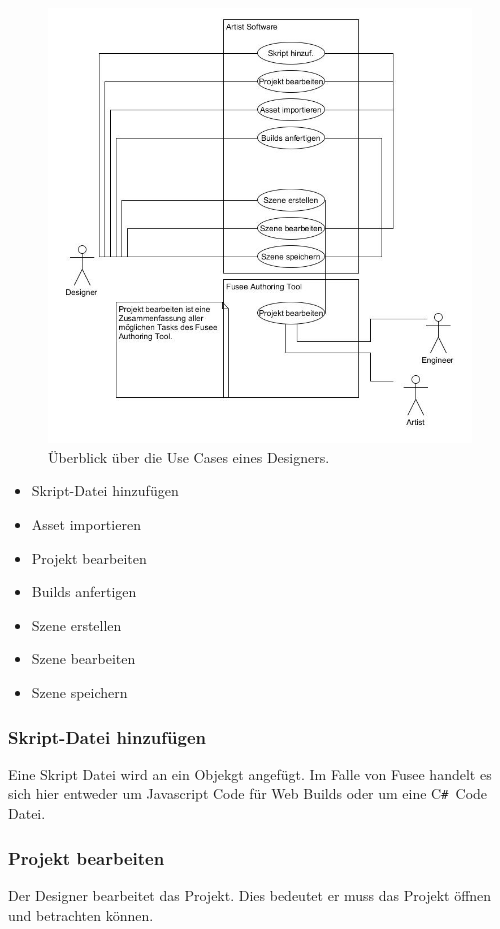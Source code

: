 \documentclass[pagesize, paper=a4, fontsize=12pt, titlepage=true, headings=small, headnosepline, abstractoff, liststotoc, nochapterprefix, plainheadsepline, twoside]{scrreprt}
\newcommand{\CSS}{C\texttt{\# }}
\begin{document}
\begin{figure}[ht]
	\centering
	\includegraphics[width=\linewidth - 2cm]{Bilder/UseCase_Designer.jpg}
	\caption{Überblick über die Use Cases eines Designers.}
	\label{UseCaseDesigner}
\end{figure}

\begin{itemize}
\item Skript-Datei hinzufügen
\item Asset importieren
\item Projekt bearbeiten
\item Builds anfertigen
\item Szene erstellen
\item Szene bearbeiten
\item Szene speichern
\end{itemize}

\subsubsection{Skript-Datei hinzufügen}
Eine Skript Datei wird an ein Objekgt angefügt. Im Falle von Fusee handelt es sich hier entweder um Javascript Code für Web Builds oder um eine \CSS Code Datei.
\subsubsection{Projekt bearbeiten}
Der Designer bearbeitet das Projekt. Dies bedeutet er muss das Projekt öffnen und betrachten können.
\end{document}
